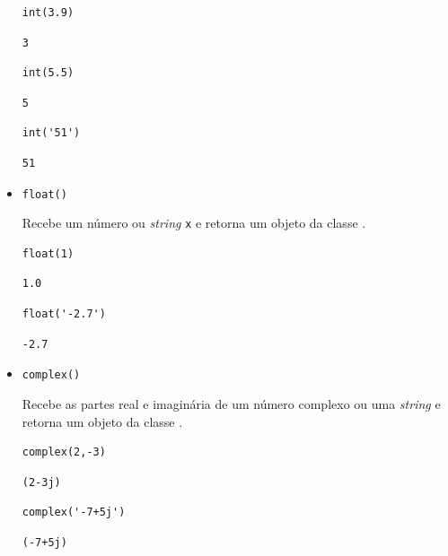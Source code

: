 \begin{itemize}
\begin{lstlisting}[xrightmargin=2.5em]
int(3.9)
\end{lstlisting}

\begin{verbatim}
3
\end{verbatim}

\begin{lstlisting}[xrightmargin=2.5em]
int(5.5)
\end{lstlisting}

\begin{verbatim}
5
\end{verbatim}

\begin{lstlisting}[xrightmargin=2.5em]
int('51')
\end{lstlisting}

\begin{verbatim}
51
\end{verbatim}

\item \lstinline+float()+ 

  Recebe um número ou \textit{string} \lstinline+x+ e retorna um objeto da classe {\PYTHONfloat}.

\begin{lstlisting}[xrightmargin=2.5em]
float(1)
\end{lstlisting}

\begin{verbatim}
1.0
\end{verbatim}

\begin{lstlisting}[xrightmargin=2.5em]
float('-2.7')
\end{lstlisting}

\begin{verbatim}
-2.7
\end{verbatim}


\item \lstinline+complex()+ 

  Recebe as partes real e imaginária de um número complexo ou uma \textit{string} e retorna um objeto da classe {\PYTHONcomplex}.

\begin{lstlisting}[xrightmargin=2.5em]
complex(2,-3)
\end{lstlisting}

\begin{verbatim}
(2-3j)
\end{verbatim}

\begin{lstlisting}[xrightmargin=2.5em]
complex('-7+5j')
\end{lstlisting}

\begin{verbatim}
(-7+5j)
\end{verbatim}

\end{itemize}

